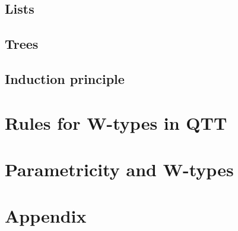 \documentclass[12pt,a4paper]{article}
\begin{document}
\subsection{Lists}
\subsection{Trees}

\subsection{Induction principle}

\section{Rules for W-types in QTT}
\section{Parametricity and W-types}

\newpage
\section{Appendix}
\end{document}
